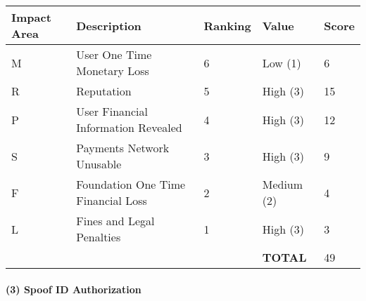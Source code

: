 \documentclass[12pt]{article} %
\begin{document}
{\begin{center}
\begin{tabular}{ | l | l | l | l | l |}
  \hline
  \textbf{Impact Area} & \textbf{Description} & \textbf{Ranking} & \textbf{Value} & \textbf{Score}
  \\ \hline
  M & User One Time Monetary Loss			& 6	& Low (1)		& 6
  \\ \hline
  R & Reputation		& 5	& High (3)		& 15
  \\ \hline
  P & User Financial Information Revealed		& 4	& High (3)		& 12
  \\ \hline
  S & Payments Network Unusable					& 3	& High (3)		& 9
  \\ \hline
  F & Foundation One Time Financial Loss	& 2	& Medium (2)	& 4
  \\ \hline
  L & Fines and Legal Penalties						& 1	& High (3)		& 3
  \\ \hline
  & & & \textbf{TOTAL} & 49
  \\ \hline
\end{tabular}
\end{center}
\label{tab:severityBruteForceIdAddressLookup}

\paragraph{(3) Spoof ID Authorization }

}
\end{document}
